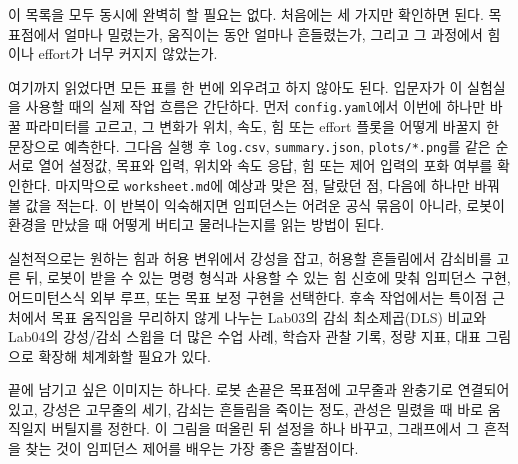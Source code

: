 이 목록을 모두 동시에 완벽히 할 필요는 없다.
처음에는 세 가지만 확인하면 된다.
목표점에서 얼마나 밀렸는가, 움직이는 동안 얼마나 흔들렸는가, 그리고 그 과정에서 힘이나 effort가 너무 커지지 않았는가.

여기까지 읽었다면 모든 표를 한 번에 외우려고 하지 않아도 된다.
입문자가 이 실험실을 사용할 때의 실제 작업 흐름은 간단하다.
먼저 \texttt{config.yaml}에서 이번에 하나만 바꿀 파라미터를 고르고, 그 변화가 위치, 속도, 힘 또는 effort 플롯을 어떻게 바꿀지 한 문장으로 예측한다.
그다음 실행 후 \texttt{log.csv}, \texttt{summary.json}, \texttt{plots/*.png}를 같은 순서로 열어 설정값, 목표와 입력, 위치와 속도 응답, 힘 또는 제어 입력의 포화 여부를 확인한다.
마지막으로 \texttt{worksheet.md}에 예상과 맞은 점, 달랐던 점, 다음에 하나만 바꿔 볼 값을 적는다.
이 반복이 익숙해지면 임피던스는 어려운 공식 묶음이 아니라, 로봇이 환경을 만났을 때 어떻게 버티고 물러나는지를 읽는 방법이 된다.

실천적으로는 원하는 힘과 허용 변위에서 강성을 잡고, 허용할 흔들림에서 감쇠비를 고른 뒤, 로봇이 받을 수 있는 명령 형식과 사용할 수 있는 힘 신호에 맞춰 임피던스 구현, 어드미턴스식 외부 루프, 또는 목표 보정 구현을 선택한다.
후속 작업에서는 특이점 근처에서 목표 움직임을 무리하지 않게 나누는 Lab03의 감쇠 최소제곱(DLS) 비교와 Lab04의 강성/감쇠 스윕을 더 많은 수업 사례, 학습자 관찰 기록, 정량 지표, 대표 그림으로 확장해 체계화할 필요가 있다.

끝에 남기고 싶은 이미지는 하나다.
로봇 손끝은 목표점에 고무줄과 완충기로 연결되어 있고, 강성은 고무줄의 세기, 감쇠는 흔들림을 죽이는 정도, 관성은 밀렸을 때 바로 움직일지 버틸지를 정한다.
이 그림을 떠올린 뒤 설정을 하나 바꾸고, 그래프에서 그 흔적을 찾는 것이 임피던스 제어를 배우는 가장 좋은 출발점이다.
